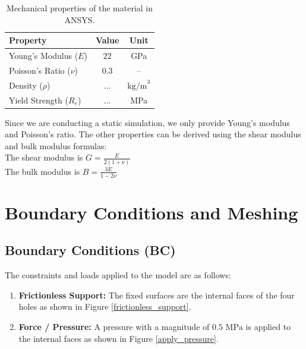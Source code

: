 \documentclass[12pt, a4paper]{article}
\begin{document}
	\begin{table}[H]
		\centering
		\caption{Mechanical properties of the material in ANSYS.}
		\label{tab:material}
		\begin{tabular}{lcc}
			\toprule
			\textbf{Property} & \textbf{Value} & \textbf{Unit} \\
			\midrule
			Young's Modulus ($E$) & $22$ & GPa \\
			Poisson's Ratio ($\nu$) & $0.3$ & -- \\
			Density ($\rho$) & $...$ & $\text{kg/m}^3$ \\
			Yield Strength ($R_e$) & $...$ & MPa \\
			\bottomrule
		\end{tabular}
	\end{table}
	
	Since we are conducting a static simulation, we only provide Young's modulus and Poisson's ratio. The other properties can be derived using the shear modulus and bulk modulus formulas: \\
	The shear modulus is $ G = \frac{E}{2(1 + \nu)} $ \\
	The bulk modulus is $ B = \frac{3 E}{1 - 2 \nu} $
	
	
	
	
	
	
	
	
	
	
	
	
	
	
	
	
	\section{Boundary Conditions and Meshing}
	
	
	\subsection{Boundary Conditions (BC)}
	The constraints and loads applied to the model are as follows:
	\begin{enumerate}
		\item \textbf{Frictionless Support:} The fixed surfaces are the internal faces of the four holes as shown in Figure \ref{frictionless_support}.
		\item \textbf{Force / Pressure:} A pressure with a magnitude of $0.5\text{ MPa}$ is applied to the internal faces as shown in Figure \ref{apply_pressure}.
	\end{enumerate}
	
\end{document}
